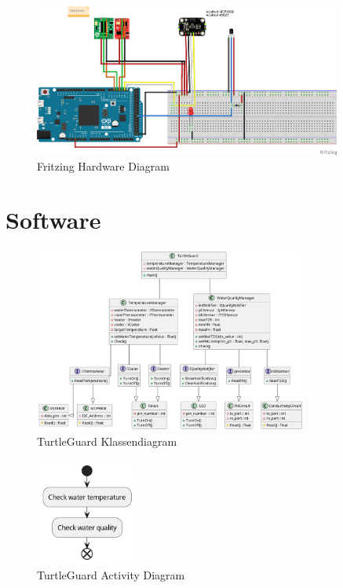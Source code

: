 \documentclass[a4paper]{report}
\newcommand{\turtleguard}{\mbox{TurtleGuard\texttrademark}\xspace}
\begin{document}
\begin{figure}[h]
  \centering
  \includegraphics[width=0.9\textwidth]{Images/hardware_sketch_fritzing.png}
  \caption{Fritzing Hardware Diagram}
  \label{fig:hardware_sketch_fritzing}
\end{figure}


\section{Software}
\begin{figure}[h]
  \centering
  \includegraphics[width=0.8\textwidth]{Images/classdiagram.png}
  \caption{\turtleguard Klassendiagram}
  \label{fig:classdiagram}
\end{figure}


\begin{figure}[h]
  \centering
  \includegraphics[width=0.3\textwidth]{Images/ActivityDiagram.png}
  \caption{\turtleguard Activity Diagram}
  \label{fig:activitydiagram}
\end{figure}
\end{document}
